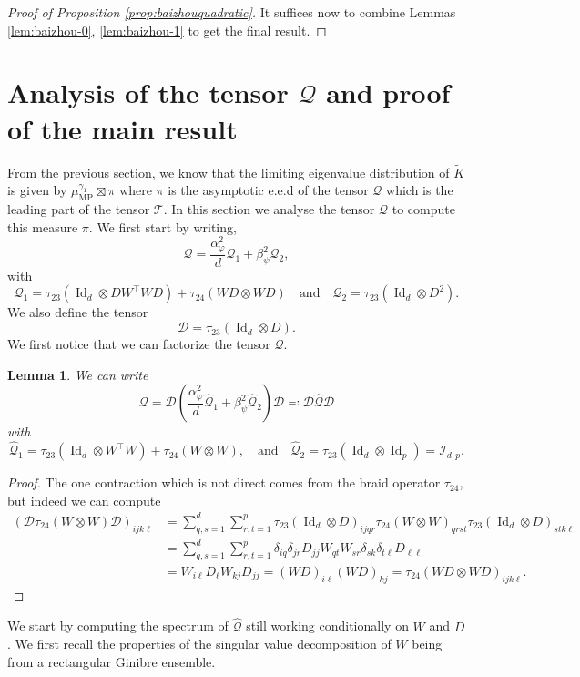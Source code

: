 \documentclass[letterpaper, 10pt, dvipsnames]{article}
\numberwithin{equation}{section}
\DeclareMathOperator{\Id}{Id}
\newcommand{\D}{\mathcal{D}}
\newcommand{\Q}{\mathcal{Q}}
\newcommand{\T}{\mathcal{T}}
\renewcommand{\phi}{\varphi}
\renewcommand{\hat}{\widehat}
\newcommand{\wt}{\widetilde}
\newtheorem{lem}[ccounter]{Lemma}
\theoremstyle{definition}
\begin{document}
\begin{proof}[Proof of Proposition \ref{prop:baizhouquadratic}] It suffices now to combine Lemmas \ref{lem:baizhou-0}, \ref{lem:baizhou-1} to get the final result.
  
\end{proof}
\section{Analysis of the tensor \texorpdfstring{$\Q$}{Q} and proof of the main result}\label{sec:analysisQ} 
From the previous section, we know that the limiting eigenvalue distribution of $\wt{K}$ is given by $\mu_{\mathrm{MP}}^{\gamma_1}\boxtimes \pi$ where $\pi$ is the asymptotic e.e.d of the tensor $\Q$ which is the leading part of the tensor $\T$. In this section we analyse the tensor $\Q$ to compute this measure $\pi$. We first start by writing,
\[
\Q = \frac{\alpha_\phi^2}{d}\Q_1 + \beta_\psi^2\Q_2,  
\]
with 
\[
\Q_1 = \tau_{23}\left(
  \Id_d\otimes DW^\top WD
\right)
+
\tau_{24}(WD\otimes WD)
\quad\text{and}\quad  
\Q_2 =  \tau_{23}\left(
  \Id_d\otimes D^2
\right).
\]
We also define the tensor 
\[
\D = \tau_{23}(\Id_d\otimes D).  
\]
We first notice that we can factorize the tensor $\Q$.
\begin{lem}\label{lem:factor}
  We can write 
  \[
  \Q = \D\left(
    \frac{\alpha_\phi^2}{d} \hat{\Q}_1  + \beta_\psi^2  \hat{\Q}_2
  \right)\D 
  \eqqcolon 
  \D\hat{\Q}\D
  \]
  with 
  \[
  \hat{\Q}_1 = \tau_{23}\left(
    \Id_d\otimes W^\top W
  \right)
  +
  \tau_{24}(W\otimes W),
  \quad\text{and}\quad 
  \hat{\Q}_2 = \tau_{23}(\Id_d\otimes \Id_p)=\mathcal{I}_{d,p}.  
  \]
\end{lem}
\begin{proof}
  The one contraction which is not direct comes from the braid operator $\tau_{24}$, but indeed we can compute 
  \begin{align*}
  \left( 
    \D\tau_{24}(W\otimes W)\D 
  \right)_{ijk\ell}
  &=
  \sum_{q,s=1}^d\sum_{r,t=1}^p
  \tau_{23}(\Id_d\otimes D)_{ijqr}
  \tau_{24}(W\otimes W)_{qrst}
  \tau_{23}(\Id_d\otimes D)_{stk\ell}
  \\
  &=
  \sum_{q,s=1}^d \sum_{r,t=1}^p \delta_{iq}\delta_{jr}D_{jj}W_{qt}W_{sr}\delta_{sk}\delta_{t\ell}D_{\ell\ell}
  \\
  &=
  W_{i\ell}D_{\ell}W_{kj}D_{jj}=(WD)_{i\ell}(WD)_{kj}=\tau_{24}(WD\otimes WD)_{ijk\ell}.
  \end{align*}
\end{proof}
We start by computing the spectrum of $\hat{\Q}$ still working conditionally on $W$ and $D$. We first recall the properties of the singular value decomposition of $W$ being from a rectangular Ginibre ensemble.
\end{document}
